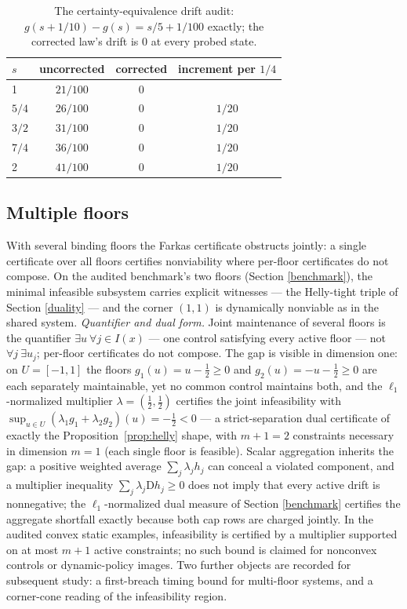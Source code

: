 \documentclass[10pt,twocolumn]{article}
\theoremstyle{definition}
\begin{document}
\begin{table}[t]
\centering
\footnotesize
\caption{The certainty-equivalence drift audit:
\(g(s + 1/10) - g(s) = s/5 + 1/100\) exactly; the corrected law's
drift is \(0\) at every probed state.}
\label{tab:drift}
\begin{tabular}{@{}l c c c@{}}
\toprule
\(s\) & uncorrected & corrected & increment per \(1/4\)\\
\midrule
1 & $21/100$ & 0 & \\
$5/4$ & $26/100$ & 0 & $1/20$\\
$3/2$ & $31/100$ & 0 & $1/20$\\
$7/4$ & $36/100$ & 0 & $1/20$\\
2 & $41/100$ & 0 & $1/20$\\
\bottomrule
\end{tabular}
\end{table}

\subsection{Multiple floors}\label{floors}

With several binding floors the Farkas certificate obstructs jointly: a
single certificate over all floors certifies nonviability where
per-floor certificates do not compose. On the audited benchmark's two
floors (Section \ref{benchmark}), the minimal infeasible subsystem
carries explicit witnesses --- the Helly-tight triple of Section
\ref{duality} --- and the corner \((1,1)\) is dynamically nonviable
as in the shared system. \emph{Quantifier and dual form.} Joint maintenance of several floors is the quantifier \(\exists u\ \forall j \in I(x)\) --- one control satisfying every active floor --- not \(\forall j\ \exists u_j\); per-floor certificates do not compose. The gap is visible in dimension one: on \(U = [-1, 1]\) the floors \(g_1(u) = u - \tfrac12 \ge 0\) and \(g_2(u) = -u - \tfrac12 \ge 0\) are each separately maintainable, yet no common control maintains both, and the \(\ell_1\)-normalized multiplier \(\lambda = (\tfrac12, \tfrac12)\) certifies the joint infeasibility with \(\sup_{u \in U}(\lambda_1 g_1 + \lambda_2 g_2)(u) = -\tfrac12 < 0\) --- a strict-separation dual certificate of exactly the Proposition~\ref{prop:helly} shape, with \(m + 1 = 2\) constraints necessary in dimension \(m = 1\) (each single floor is feasible). Scalar aggregation inherits the gap: a positive weighted average \(\sum_j \lambda_j h_j\) can conceal a violated component, and a multiplier inequality \(\sum_j \lambda_j \mathrm{D}h_j \ge 0\) does not imply that every active drift is nonnegative; the \(\ell_1\)-normalized dual measure of Section \ref{benchmark} certifies the aggregate shortfall exactly because both cap rows are charged jointly. In the audited convex static examples, infeasibility is certified by a multiplier supported on at most \(m + 1\) active constraints; no such bound is claimed for nonconvex controls or dynamic-policy images. Two further objects are recorded for subsequent study: a
first-breach timing bound for multi-floor systems, and a corner-cone
reading of the infeasibility region.
\end{document}
